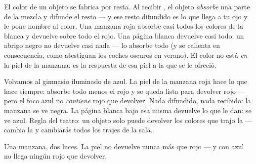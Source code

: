 \begin{proposition}\label{prop:g8:colors-spectra:objectcolor}
El color de un objeto  se fabrica por resta. Al recibir
, el objeto \emph{absorbe} una parte de la mezcla y difunde el
resto --- y ese resto difundido es lo que llega a tu ojo y le pone
nombre al color. Una manzana roja absorbe casi todos los colores de la
 blanca y devuelve sobre todo el rojo. Una página blanca devuelve
casi todo; un abrigo negro no devuelve casi nada --- lo absorbe todo (y
se calienta en consecuencia, como atestiguan los coches oscuros en
verano). El color no está \emph{en} la piel de la manzana: es la
respuesta de esa piel a la  que se le ofreció.
\end{proposition}

\begin{example}\label{ex:g8:colors-spectra:gym}
Volvamos al gimnasio iluminado de azul. La piel de la manzana roja hace
lo que hace siempre: absorbe todo menos el rojo y se queda lista para
devolver rojo --- pero el foco azul no \emph{contiene} rojo que
devolver. Nada difundido, nada recibido: la manzana se ve negra. La
página blanca bajo esa misma  devuelve lo que le dan: se ve
azul. Regla del teatro: un objeto solo puede devolver los colores que
trajo la  --- cambia la  y cambiarás todos los
trajes de la sala.
\end{example}

\begin{omfigure}

{\small Una manzana, dos luces. La piel no devuelve nunca más que
rojo --- y con  azul no llega ningún rojo que devolver.}
\end{omfigure}


